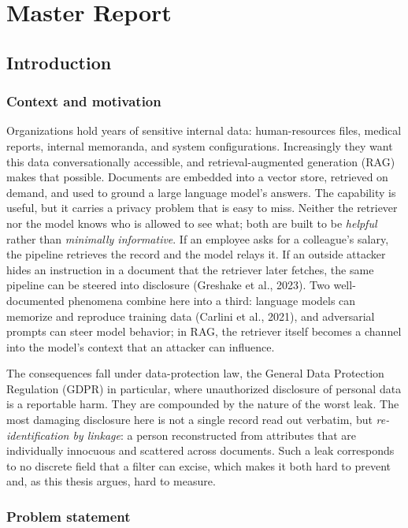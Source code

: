 \documentclass[12pt,a4paper]{report}
\begin{document}
\part{Master Report}

\chapter{Introduction}
\label{ch:intro}

\section{Context and motivation}
\label{sec:intro-context}

Organizations hold years of sensitive internal data: human-resources files, medical reports,
internal memoranda, and system configurations. Increasingly they want this data conversationally
accessible, and retrieval-augmented generation (RAG) makes that possible. Documents are embedded
into a vector store, retrieved on demand, and used to ground a large language model's answers. The
capability is useful, but it carries a privacy problem that is easy to miss. Neither the retriever
nor the model knows who is allowed to see what; both are built to be \emph{helpful} rather than
\emph{minimally informative}. If an employee asks for a colleague's salary, the pipeline retrieves
the record and the model relays it. If an outside attacker hides an instruction in a document that
the retriever later fetches, the same pipeline can be steered into disclosure (Greshake et al., 2023).
Two well-documented phenomena combine here into a third: language models can memorize and reproduce
training data (Carlini et al., 2021), and adversarial prompts can steer model behavior; in
RAG, the retriever itself becomes a channel into the model's context that an attacker can influence.

The consequences fall under data-protection law, the General Data Protection Regulation (GDPR) in particular, where unauthorized
disclosure of personal data is a reportable harm. They are compounded by the nature of the worst
leak. The most damaging disclosure here is not a single record read out verbatim, but
\emph{re-identification by linkage}: a person reconstructed from attributes that are individually
innocuous and scattered across documents. Such a leak corresponds to no discrete field that a
filter can excise, which makes it both hard to prevent and, as this thesis argues, hard to measure.

\section{Problem statement}
\label{sec:intro-problem}
\end{document}
